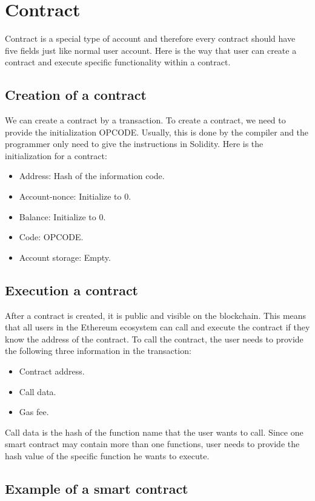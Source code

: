 \documentclass{article}
\begin{document}
\section*{Contract}
Contract is a special type of account and therefore every contract should have five fields just like normal user account. Here is the way that user can create a contract and execute specific functionality within a contract.
\subsection*{Creation of a contract}
We can create a contract by a transaction. To create a contract, we need to provide the initialization OPCODE. Usually, this is done by the compiler and the programmer only need to give the instructions in Solidity. Here is the initialization for a contract:
\begin{itemize}
  \item Address: Hash of the information code.
  \item Account-nonce: Initialize to 0.
  \item Balance: Initialize to 0.
  \item Code: OPCODE.
  \item Account storage: Empty.
\end{itemize}

\subsection*{Execution a contract}
After a contract is created, it is public and visible on the blockchain. This means that all users in the Ethereum ecosystem can call and execute the contract if they know the address of the contract. To call the contract, the user needs to provide the following three information in the transaction:
\begin{itemize}
  \item Contract address.
  \item Call data.
  \item Gas fee.
\end{itemize}
Call data is the hash of the function name that the user wants to call. Since one smart contract may contain more than one functions, user needs to provide the hash value of the specific function he wants to execute.

\subsection*{Example of a smart contract}
\end{document}
